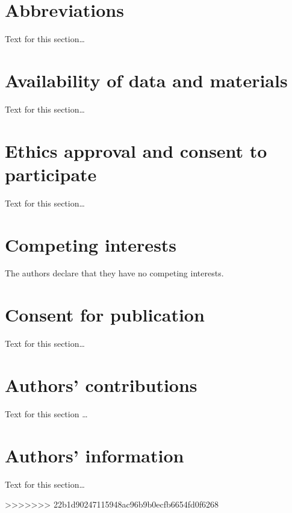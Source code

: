 \documentclass{bmcart}
\begin{document}
\begin{backmatter}
\section*{Abbreviations}%
Text for this section\ldots

\section*{Availability of data and materials}%
Text for this section\ldots

\section*{Ethics approval and consent to participate}%
Text for this section\ldots

\section*{Competing interests}
The authors declare that they have no competing interests.

\section*{Consent for publication}%
Text for this section\ldots

\section*{Authors' contributions}
Text for this section \ldots

\section*{Authors' information}%
Text for this section\ldots

>>>>>>> 22b1d90247115948ac96b9b0ecfb6654fd0f6268


\end{backmatter}
\end{document}
